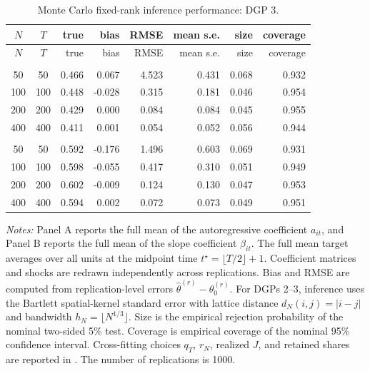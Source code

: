\begingroup
\small
\setlength{\LTleft}{0pt plus 1fill}
\setlength{\LTright}{0pt plus 1fill}
\begin{longtable}{ccrrrrrr}
\caption{Monte Carlo fixed-rank inference performance: DGP 3.}\label{tab:mc_perf_dgp3}\\
\toprule
$N$ & $T$ & true & bias & RMSE & mean s.e. & size & coverage \\
\midrule
\endfirsthead
\toprule
$N$ & $T$ & true & bias & RMSE & mean s.e. & size & coverage \\
\midrule
\endhead
\bottomrule
\endfoot
\multicolumn{8}{l}{\textit{Panel A. Autoregressive coefficient full mean}}\\
50 & 50 & 0.466 & 0.067 & 4.523 & 0.431 & 0.068 & 0.932 \\
100 & 100 & 0.448 & -0.028 & 0.315 & 0.181 & 0.046 & 0.954 \\
200 & 200 & 0.429 & 0.000 & 0.084 & 0.084 & 0.045 & 0.955 \\
400 & 400 & 0.411 & 0.001 & 0.054 & 0.052 & 0.056 & 0.944 \\
\addlinespace
\multicolumn{8}{l}{\textit{Panel B. Slope coefficient full mean}}\\
50 & 50 & 0.592 & -0.176 & 1.496 & 0.603 & 0.069 & 0.931 \\
100 & 100 & 0.598 & -0.055 & 0.417 & 0.310 & 0.051 & 0.949 \\
200 & 200 & 0.602 & -0.009 & 0.124 & 0.130 & 0.047 & 0.953 \\
400 & 400 & 0.594 & 0.002 & 0.072 & 0.073 & 0.049 & 0.951 \\
\end{longtable}
\par\smallskip
{\footnotesize\begin{minipage}{0.92\textwidth}\textit{Notes:} Panel A reports the full mean of the autoregressive coefficient $a_{it}$, and Panel B reports the full mean of the slope coefficient $\beta_{it}$. The full mean target averages over all units at the midpoint time $t^\star=\lfloor T/2\rfloor+1$. Coefficient matrices and shocks are redrawn independently across replications. Bias and RMSE are computed from replication-level errors $\widehat\theta^{(r)}-\theta_0^{(r)}$. For DGPs 2--3, inference uses the Bartlett spatial-kernel standard error with lattice distance $d_N(i,j)=|i-j|$ and bandwidth $h_N=\lfloor N^{1/3}\rfloor$. Size is the empirical rejection probability of the nominal two-sided 5\% test. Coverage is empirical coverage of the nominal 95\% confidence interval. Cross-fitting choices $q_T$, $r_N$, realized $J$, and retained shares are reported in . The number of replications is 1000.\end{minipage}}
\endgroup
